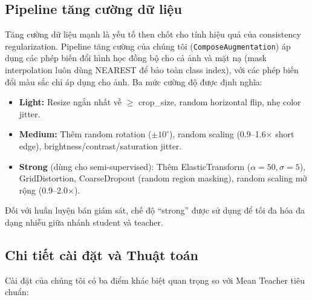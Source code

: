 \documentclass[conference]{IEEEtran}
\begin{document}
\subsection{Pipeline tăng cường dữ liệu}

Tăng cường dữ liệu mạnh là yếu tố then chốt cho tính hiệu quả của consistency regularization. Pipeline tăng cường của chúng tôi (\texttt{ComposeAugmentation}) áp dụng các phép biến đổi hình học đồng bộ cho cả ảnh và mặt nạ (mask interpolation luôn dùng NEAREST để bảo toàn class index), với các phép biến đổi màu sắc chỉ áp dụng cho ảnh. Ba mức cường độ được định nghĩa:

\begin{itemize}
    \item \textbf{Light:} Resize ngắn nhất về $\geq$ crop\_size, random horizontal flip, nhẹ color jitter.
    \item \textbf{Medium:} Thêm random rotation ($\pm10^\circ$), random scaling (0.9--1.6$\times$ short edge), brightness/contrast/saturation jitter.
    \item \textbf{Strong} (dùng cho semi-supervised): Thêm ElasticTransform ($\alpha=50, \sigma=5$), GridDistortion, CoarseDropout (random region masking), random scaling mở rộng (0.9--2.0$\times$).
\end{itemize}

Đối với huấn luyện bán giám sát, chế độ ``strong'' được sử dụng để tối đa hóa đa dạng nhiễu giữa nhánh student và teacher.

\subsection{Chi tiết cài đặt và Thuật toán}

Cài đặt của chúng tôi có ba điểm khác biệt quan trọng so với Mean Teacher tiêu chuẩn:
\end{document}
